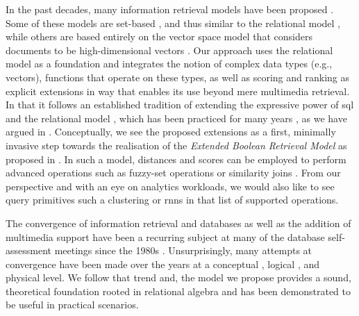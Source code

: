 In the past decades, many information retrieval models have been proposed \cite{Umano:1983Retrieval,Salton:1983Extended,Wong:1985Generalized}. Some of these models are set-based \cite{Salton:1983Extended,Umano:1983Retrieval}, and thus similar to the relational model \cite{Codd:1970Relational}, while others are based entirely on the vector space model that considers documents to be high-dimensional vectors \cite{Wong:1985Generalized}. Our approach uses the relational model as a foundation and integrates the notion of complex data types (e.g., vectors), functions that operate on these types, as well as scoring and ranking as explicit extensions in way that enables its use beyond mere multimedia retrieval. In that it follows an established tradition of extending the expressive power of \acrshort{sql} and the relational model \cite{Libkin:2003Expressive}, which has been practiced for many years \cite{Chengkai:2005RankSQL,Zhang:2006Boolean,Belohlavek:2007Relational}, as we have argued in . Conceptually, we see the proposed extensions as a first, minimally invasive step towards the realisation of the \emph{Extended Boolean Retrieval Model} as proposed in \cite{Salton:1983Extended}. In such a model, distances and scores can be employed to perform advanced operations such as fuzzy-set operations or similarity joins \cite{Umano:1983Retrieval,Zadeh:1996Fuzzy,Bohm:2001Fast}. From our perspective and with an eye on analytics workloads, we would also like to see query primitives such a clustering or \acrshort{rnns} \cite{Korn:2000Influence} in that list of supported operations.

The convergence of information retrieval and databases as well as the addition of multimedia support have been a recurring subject at many of the database self-assessment meetings since the 1980s \cite{Agrawal:2008Claremont}. Unsurprisingly, many attempts at convergence have been made over the years at a conceptual \cite{Marcus:1996Foundations,Adjeroh:1997Multimedia,Watanabe:1998Multimedia}, logical \cite{Zhang:2006Boolean,Belohlavek:2007Relational}, and physical \cite{Silva:2010SimDB,Giangreco:2014Adam,Whang:2015DB,Giangreco:2016Adam,Yang:2020Pase} level. We follow that trend and, the model we propose provides a sound, theoretical foundation rooted in relational algebra and has been demonstrated to be useful in practical scenarios. 

